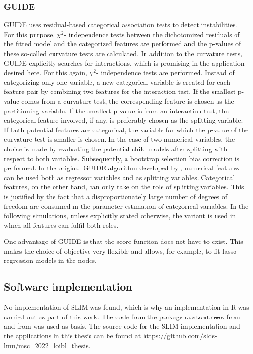 \subsubsection{GUIDE}
GUIDE \citep{Loh.2002} uses residual-based categorical association tests to detect instabilities. For this purpose, $\chi^2$- independence tests between the dichotomized residuals of the fitted model and the categorized features are performed and the p-values of these so-called curvature tests are calculated. In addition to the curvature tests, GUIDE explicitly searches for interactions, which is promising in the application desired here.  For this again, $\chi^2$- independence tests are performed. Instead of categorizing only one variable, a new categorical variable is created for each feature pair by combining  two features for the interaction test. If the smallest p-value comes from a curvature test, the corresponding feature is chosen as the partitioning variable. If the smallest p-value is from an interaction test, the categorical feature involved, if any, is preferably chosen as the splitting variable. If both potential features are categorical, the variable for which the p-value of the curvature test is smaller is chosen. In the case of two numerical variables, the choice is made by evaluating the potential child models after splitting with respect to both variables.
Subsequently, a bootstrap selection bias correction is performed.
In the original GUIDE algorithm developed by \citep{Loh.2002}, numerical features can be used both as regressor variables and as splitting variables. Categorical features, on the other hand, can only take on the role of splitting variables. This is justified by the fact that a disproportionately large number of degrees of freedom are consumed in the parameter estimation of categorical variables.
In the following simulations, unless explicitly stated otherwise, the variant is used in which all features can fulfil both roles. 

One advantage of GUIDE is that the score function does not have to exist. This makes the choice of objective very flexible and allows, for example, to fit lasso regression models  in the nodes.




\subsection{Software implementation}

No implementation of SLIM was found, which is why an implementation in R  \citep{RCoreTeam.2022} was carried out as part of this work. The code from the package $\mathtt{customtrees}$ from \citet{Casalicchio.2020} and from \citet{Herbinger.2022} was used as basis. The source code for the SLIM implementation and the applications in this thesis can be found at \url{https://github.com/slds-lmu/msc_2022_loibl_thesis}. 

